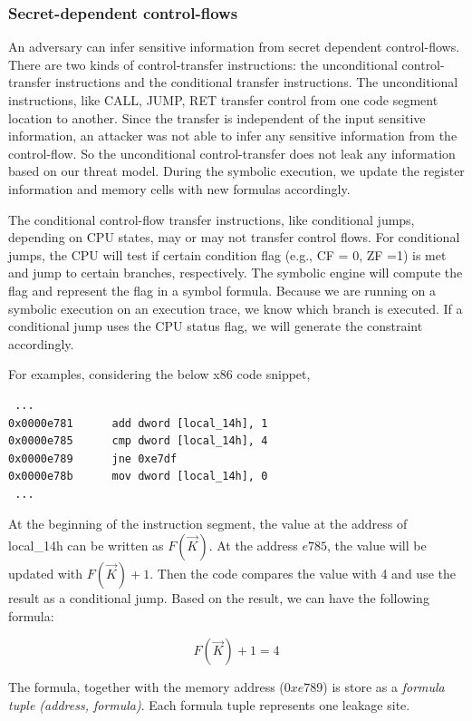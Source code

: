 \subsubsection{Secret-dependent control-flows}
An adversary can infer sensitive information from secret dependent control-flows. There are two kinds of control-transfer instructions: the unconditional control-transfer instructions and the conditional transfer instructions.
The unconditional instructions, like CALL, JUMP, RET transfer control from one code segment location to another. Since the transfer is independent of the input sensitive information, an attacker was not able to infer any sensitive information from the control-flow. 
So the unconditional control-transfer does not leak any information based on our threat model. During the symbolic execution, we update the register information and memory cells with new formulas accordingly.

The conditional control-flow transfer instructions, like conditional jumps, depending on CPU states, may or may not transfer control flows. For conditional jumps, the CPU will test if certain condition flag 
(e.g., CF = 0, ZF =1) is met and jump to certain branches, respectively.
The symbolic engine will compute the flag and represent the flag in a symbol 
formula. Because we are running on a symbolic execution on an execution trace, we know which branch is executed.
If a conditional jump uses the CPU status flag, we will generate the constraint accordingly.

For examples, considering the below x86 code snippet,

\begin{lstlisting}
 ...
0x0000e781      add dword [local_14h], 1
0x0000e785      cmp dword [local_14h], 4
0x0000e789      jne 0xe7df
0x0000e78b      mov dword [local_14h], 0
 ...
\end{lstlisting}

At the beginning of the instruction segment, the value at the address of local\_14h can be written as $F(\vec{K})$. At the address $e785$, the value will be updated with $F(\vec{K})+1$. Then the code compares 
the value with 4 and use the result as a conditional jump. Based on the result, we can have the following formula:

$$F(\vec{K}) + 1 = 4$$

The formula, together with the memory address ($0xe789$) is store as a \textit{formula tuple (address, formula)}. Each formula tuple represents one leakage site.

